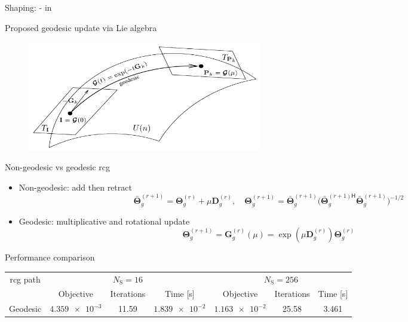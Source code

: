 \documentclass[presentation,xcolor={table},9pt]{beamer}
\begin{document}
\begin{section}{Shaping: - in }
	\begin{frame}{Proposed geodesic update via Lie algebra}
		\vspace{-0.25cm}
		\begin{figure}
			\centering
			\includegraphics[width=0.5\textwidth]{../assets/viva/lie_group.pdf}
		\end{figure}
		\vspace{-0.25cm}
		\begin{block}{Non-geodesic vs geodesic \gls{rcg}}
			\begin{itemize}
				\item Non-geodesic: add then retract
				\begin{equation*}
					\bar{\mathbf{\Theta}}_g^{(r+1)} = \mathbf{\Theta}_g^{(r)} + \mu \mathbf{D}_g^{(r)}, \quad \mathbf{\Theta}_g^{(r+1)} = \bar{\mathbf{\Theta}}_g^{(r+1)} \bigl({\bar{\mathbf{\Theta}}_g^{(r+1)\mathsf{H}}} \bar{\mathbf{\Theta}}_g^{(r+1)}\bigr)^{-1/2}
				\end{equation*}
				\item Geodesic: multiplicative and rotational update
				\begin{equation*}
					\mathbf{\Theta}_g^{(r+1)} = \mathbf{G}_g^{(r)}(\mu) = \exp(\mu \mathbf{D}_g^{(r)}) \mathbf{\Theta}_g^{(r)}
					\label{eq:update_geodesic}
				\end{equation*}
			\end{itemize}
		\end{block}
		\begin{exampleblock}{Performance comparison}
			\begin{table}
				\label{tb:complexity_test}
				\centering
				\tiny
				\begin{tabular}{ccccccc}
					\toprule
					\multirow{2}{*}{\gls{rcg} path} & \multicolumn{3}{c}{$N_\mathrm{S}=16$} & \multicolumn{3}{c}{$N_\mathrm{S}=256$}                                                               \\ \cmidrule(lr){2-4} \cmidrule(lr){5-7}
													& Objective                             & Iterations                             & Time [s]         & Objective        & Iterations & Time [s] \\ \midrule
					Geodesic                        & $\num{4.359e-3}$                      & 11.59                                  & $\num{1.839e-2}$ & $\num{1.163e-2}$ & 25.58      & 3.461    \\

\end{tabular}
\end{table}
\end{exampleblock}
\end{frame}
\end{section}
\end{document}
